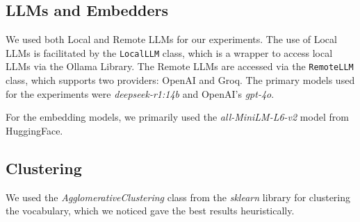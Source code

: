 \subsection{LLMs and Embedders}
We used both Local and Remote LLMs for our experiments. The use of Local LLMs is facilitated by the \texttt{LocalLLM} class, which is a wrapper 
to access local LLMs via the Ollama Library. The Remote LLMs are accessed via the \texttt{RemoteLLM} class, which supports two providers: OpenAI and Groq.
The primary models used for the experiments were \textit{deepseek-r1:14b} and OpenAI's \textit{gpt-4o}.  

For the embedding models, we primarily used the \textit{all-MiniLM-L6-v2} model from HuggingFace.

\subsection{Clustering}
We used the \textit{AgglomerativeClustering} class from the \textit{sklearn} library for clustering the vocabulary, which we noticed gave the best 
results heuristically.

